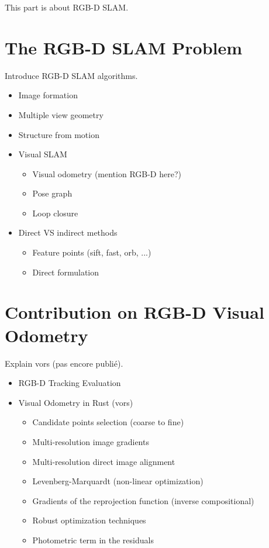 This part is about RGB-D SLAM\@.

\chapter{The RGB-D SLAM Problem}%
\label{cha:the_rgb_d_slam_problem}

Introduce RGB-D SLAM algorithms.

\begin{itemize}
	\item Image formation
	\item Multiple view geometry
	\item Structure from motion
	\item Visual SLAM
	\begin{itemize}
		\item Visual odometry (mention RGB-D here?)
		\item Pose graph
		\item Loop closure
	\end{itemize}
	\item Direct VS indirect methods
	\begin{itemize}
		\item Feature points (sift, fast, orb, ...)
		\item Direct formulation
	\end{itemize}
\end{itemize}

\chapter{Contribution on RGB-D Visual Odometry}%
\label{cha:contribution_on_rgb_d_visual_odometry}

Explain vors (pas encore publié).

\begin{itemize}
	\item RGB-D Tracking Evaluation
	\item Visual Odometry in Rust (vors)
	\begin{itemize}
		\item Candidate points selection (coarse to fine)
		\item Multi-resolution image gradients
		\item Multi-resolution direct image alignment
		\item Levenberg-Marquardt (non-linear optimization)
		\item Gradients of the reprojection function (inverse compositional)
		\item Robust optimization techniques
		\item Photometric term in the residuals
	\end{itemize}
\end{itemize}

